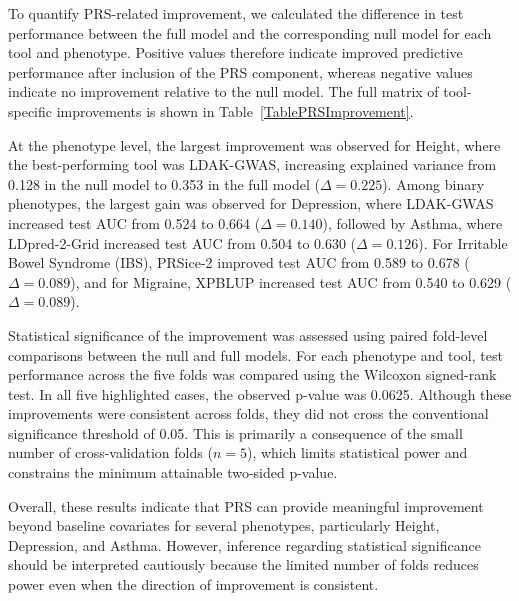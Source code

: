\documentclass[pdflatex,sn-basic]{sn-jnl}
\begin{document}
To quantify PRS-related improvement, we calculated the difference in test performance between the full model and the corresponding null model for each tool and phenotype. Positive values therefore indicate improved predictive performance after inclusion of the PRS component, whereas negative values indicate no improvement relative to the null model. The full matrix of tool-specific improvements is shown in Table~\ref{TablePRSImprovement}.

At the phenotype level, the largest improvement was observed for Height, where the best-performing tool was LDAK-GWAS, increasing explained variance from 0.128 in the null model to 0.353 in the full model ($\Delta = 0.225$). Among binary phenotypes, the largest gain was observed for Depression, where LDAK-GWAS increased test AUC from 0.524 to 0.664 ($\Delta = 0.140$), followed by Asthma, where LDpred-2-Grid increased test AUC from 0.504 to 0.630 ($\Delta = 0.126$). For Irritable Bowel Syndrome (IBS), PRSice-2 improved test AUC from 0.589 to 0.678 ($\Delta = 0.089$), and for Migraine, XPBLUP increased test AUC from 0.540 to 0.629 ($\Delta = 0.089$).

Statistical significance of the improvement was assessed using paired fold-level comparisons between the null and full models. For each phenotype and tool, test performance across the five folds was compared using the Wilcoxon signed-rank test. In all five highlighted cases, the observed p-value was 0.0625. Although these improvements were consistent across folds, they did not cross the conventional significance threshold of 0.05. This is primarily a consequence of the small number of cross-validation folds ($n=5$), which limits statistical power and constrains the minimum attainable two-sided p-value.

Overall, these results indicate that PRS can provide meaningful improvement beyond baseline covariates for several phenotypes, particularly Height, Depression, and Asthma. However, inference regarding statistical significance should be interpreted cautiously because the limited number of folds reduces power even when the direction of improvement is consistent.
\end{document}
